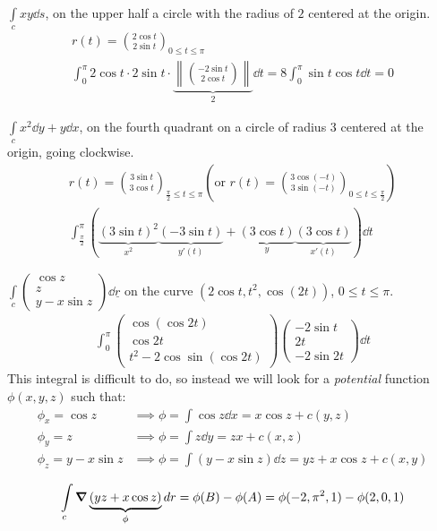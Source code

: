 \documentclass[00_complete]{subfiles}
\begin{document}
\begin{example}
    $\int\limits_cxy\dd{s}$, on the upper half a circle with the radius of $2$
    centered at the origin.
    \begin{gather*}
        r(t) = \binom{2\cos t}{2\sin t}_{0 \leq t \leq \pi} \\
        \int_{0}^{\pi}2\cos t \cdot 2 \sin t \cdot \underbrace{\left\|\binom{-2\sin
        t}{2\cos t}\right\|}_{2}\dd{t} = 8 \int_{0}^{\pi}\sin t \cos t \dd{t}=0
    \end{gather*}
\end{example}
\begin{example}
    $\int\limits_cx^2\dd{y}+y\dd{x}$, on the fourth quadrant on a circle of radius $3$
    centered at the origin, going clockwise.
    \begin{gather*}
        r(t)=\binom{3\sin t}{3\cos t}_{\frac{\pi}{2} \leq t \leq \pi} \left(\text{or }
        r(t)=\binom{3\cos(-t)}{3\sin(-t)}_{0\leq t\leq \frac{\pi}{2}}\right) \\
        \int_{\frac{\pi}{2}}^{\pi}(
            \underbrace{(3\sin t)^2}_{x^2}
            \underbrace{(-3\sin t)}_{y'(t)}+
            \underbrace{(3\cos t)}_{y}
            \underbrace{(3\cos t)}_{x'(t)}
        )\dd{t}
    \end{gather*}
\end{example}
\begin{example}
        $\int\limits_c\begin{pmatrix}
            \cos z \\ z \\y-x\sin z
        \end{pmatrix}\dd{\underline r}$ on the curve $(2\cos t,t^2,\cos(2t))$,
        $0 \leq t \leq \pi$.
        \begin{gather*}
            \int_{0}^{\pi}\begin{pmatrix}
                \cos(\cos 2t) \\ \cos 2t \\ t^2-2\cos \sin(\cos 2t)
            \end{pmatrix} \begin{pmatrix}
                -2\sin t \\ 2t \\-2\sin 2t
            \end{pmatrix}\dd{t}
        \end{gather*}
        This integral is difficult to do, so instead we will look for a
        \emph{potential} function $\phi(x,y,z)$ such that:
        \begin{align*}
            \phi_x= \cos z &\implies \phi=\int \cos z \dd{x} = x\cos z + c(y,z) \\
            \phi_y= z &\implies \phi = \int z \dd{y} = zx + c(x,z)\\
            \phi_z= y-x\sin z & \implies \boxed{\phi = \int (y-x\sin z)\dd{z} = yz +
            x \cos z + c(x,y)} \\
        \end{align*}
        $$\int\limits_c \grad\underbrace{(yz+x\cos z)}_{\phi} \dd{r} =
        \phi(B)-\phi(A) = \phi(-2,\pi^2,1)-\phi(2,0,1)$$
\end{example}
\end{document}
